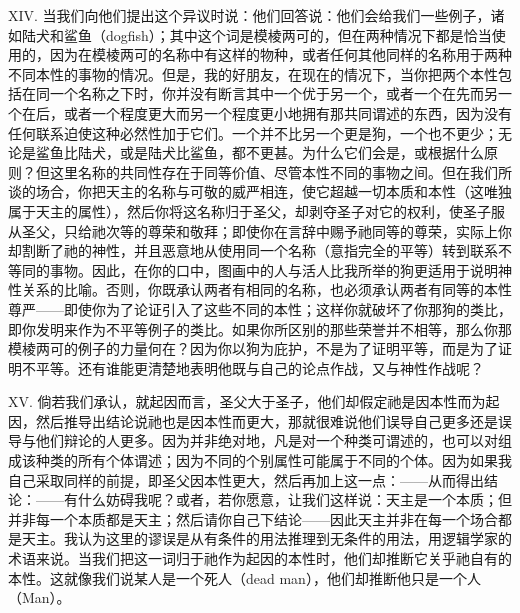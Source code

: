 XIV. 当我们向他们提出这个异议时说：他们回答说：他们会给我们一些例子，诸如陆犬和鲨鱼（dogfish）；其中这个词是模棱两可的，但在两种情况下都是恰当使用的，因为在模棱两可的名称中有这样的物种，或者任何其他同样的名称用于两种不同本性的事物的情况。但是，我的好朋友，在现在的情况下，当你把两个本性包括在同一个名称之下时，你并没有断言其中一个优于另一个，或者一个在先而另一个在后，或者一个程度更大而另一个程度更小地拥有那共同谓述的东西，因为没有任何联系迫使这种必然性加于它们。一个并不比另一个更是狗，一个也不更少；无论是鲨鱼比陆犬，或是陆犬比鲨鱼，都不更甚。为什么它们会是，或根据什么原则？但这里名称的共同性存在于同等价值、尽管本性不同的事物之间。但在我们所谈的场合，你把天主的名称与可敬的威严相连，使它超越一切本质和本性（这唯独属于天主的属性），然后你将这名称归于圣父，却剥夺圣子对它的权利，使圣子服从圣父，只给祂次等的尊荣和敬拜；即使你在言辞中赐予祂同等的尊荣，实际上你却割断了祂的神性，并且恶意地从使用同一个名称（意指完全的平等）转到联系不等同的事物。因此，在你的口中，图画中的人与活人比我所举的狗更适用于说明神性关系的比喻。否则，你既承认两者有相同的名称，也必须承认两者有同等的本性尊严——即使你为了论证引入了这些不同的本性；这样你就破坏了你那狗的类比，即你发明来作为不平等例子的类比。如果你所区别的那些荣誉并不相等，那么你那模棱两可的例子的力量何在？因为你以狗为庇护，不是为了证明平等，而是为了证明不平等。还有谁能更清楚地表明他既与自己的论点作战，又与神性作战呢？\par

XV. 倘若我们承认，就起因而言，圣父大于圣子，他们却假定祂是因本性而为起因，然后推导出结论说祂也是因本性而更大，那就很难说他们误导自己更多还是误导与他们辩论的人更多。因为并非绝对地，凡是对一个种类可谓述的，也可以对组成该种类的所有个体谓述；因为不同的个别属性可能属于不同的个体。因为如果我自己采取同样的前提，即圣父因本性更大，然后再加上这一点：——从而得出结论：——有什么妨碍我呢？或者，若你愿意，让我们这样说：天主是一个本质；但并非每一个本质都是天主；然后请你自己下结论——因此天主并非在每一个场合都是天主。我认为这里的谬误是从有条件的用法推理到无条件的用法，用逻辑学家的术语来说。当我们把这一词归于祂作为起因的本性时，他们却推断它关乎祂自有的本性。这就像我们说某人是一个死人（dead man），他们却推断他只是一个人（Man）。\par

